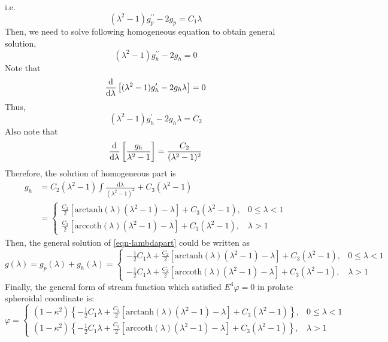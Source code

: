 \documentclass[fontsize=11pt, %
                             paper=a4, %
                             twoside, %
                             captions=tableheading,
                             index=totoc,
                             hyperref]{labbook}
\begin{document}
i.e.
\begin{equation}
(\lambda^2-1)g^{\prime\prime}_{p}-2g_p=C_1\lambda
\end{equation}
Then, we need to solve following homogeneous equation to obtain general solution,
\begin{equation}
(\lambda^2-1)g_h^{\prime\prime}-2g_{h}=0
\end{equation}
Note that
\begin{equation}
\frac{\mathrm{d} }{\mathrm{d} \lambda}\left[(\lambda^2-1)g_h^\prime-2g_h\lambda\right]=0
\end{equation}
Thus,
\begin{equation}
(\lambda^2-1)g_h^\prime-2g_h\lambda=C_2
\end{equation}
Also note that
\begin{equation}
\frac{\mathrm{d} }{\mathrm{d} \lambda}\left[\frac{g_h}{\lambda^2-1}\right]=\frac{C_2}{(\lambda^2-1)^2}
\end{equation}
Therefore, the solution of homogeneous part is
\begin{equation}
\begin{aligned}
g_h&=C_2(\lambda^2-1)\int\frac{\mathrm{d}\lambda}{(\lambda^2-1)^2}+C_3(\lambda^2-1)\\
&=
\begin{cases}
\frac{C_2}{2}\left[\mathrm{arctanh}(\lambda)(\lambda^2-1)-\lambda\right]+C_3(\lambda^2-1),&0\le\lambda<1\\
\frac{C_2}{2}\left[\mathrm{arccoth}(\lambda)(\lambda^2-1)-\lambda\right]+C_3(\lambda^2-1),&\lambda>1
\end{cases}
\end{aligned}
\end{equation}
Then, the general solution of \ref{eqn-lambdapart} could be written as
\begin{equation}
g(\lambda)=g_p(\lambda)+g_h(\lambda)=
\begin{cases}
-\frac{1}{2}C_1\lambda+\frac{C_2}{2}\left[\mathrm{arctanh}(\lambda)(\lambda^2-1)-\lambda\right]+C_3(\lambda^2-1),&0\le\lambda<1\\
-\frac{1}{2}C_1\lambda+\frac{C_2}{2}\left[\mathrm{arccoth}(\lambda)(\lambda^2-1)-\lambda\right]+C_3(\lambda^2-1),&\lambda>1
\end{cases}
\end{equation}
Finally, the general form of stream function which satisfied $E^4\varphi=0$ in prolate spheroidal coordinate is:
\begin{equation}
\varphi=
\begin{cases}
(1-\kappa^2)\left\{-\frac{1}{2}C_1\lambda+\frac{C_2}{2}\left[\mathrm{arctanh}(\lambda)(\lambda^2-1)-\lambda\right]+C_3(\lambda^2-1)\right\},&0\le\lambda<1\\
(1-\kappa^2)\left\{-\frac{1}{2}C_1\lambda+\frac{C_2}{2}\left[\mathrm{arccoth}(\lambda)(\lambda^2-1)-\lambda\right]+C_3(\lambda^2-1)\right\},&\lambda>1
\end{cases}
\end{equation}
\end{document}
